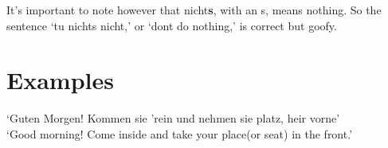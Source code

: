 \documentclass{article}
\begin{document}
It's important to note however that nicht\textbf{s}, with an s, means nothing. So the sentence `tu nichts nicht,' or `dont do nothing,' is correct but goofy.

\section{Examples}

`Guten Morgen! Kommen sie 'rein und nehmen sie platz, heir vorne'\\
`Good morning! Come inside and take your place(or seat) in the front.'
\end{document}
